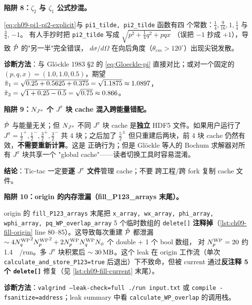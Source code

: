 \begin{pitfallbox}
\textbf{陷阱 8：\(\zeta_2\) 与 \(\zeta_1\) 公式抄混。}

\eqref{eq:ch09-pi1-pi2-explicit}与 \texttt{pi1\_tilde, pi2\_tilde} 函数有四
个常数：\(\tfrac{1}{4}, \tfrac{9}{16}, 1, \tfrac{1}{4}\) 与 \(\tfrac{3}{4}\), \(-1\)。
有人手抄时把 \texttt{pi2\_tilde} 写成 \(\sqrt{p^2+\tfrac{1}{4}q^2+pqx}\)
（误把 \(-1\) 抄成 \(+1\)），导致 \(\hat{\mathcal{P}}\) 的"另一半"完全错误，
\(d\sigma/d\Omega\) 在向后角度（\(\theta_{cm}>120^\circ\)）出现尖锐发散。

\textbf{诊断方法}：与 Glöckle 1983 \cite{Gloeckle1983} \S2 的 \eqref{eq:Gloeckle-pi}
直接对比；或对一个固定的 \((p, q, x)=(1.0, 1.0, 0.5)\)，期望
\(\tilde{\pi}_{1}=\sqrt{0.25+0.5625+0.375}=\sqrt{1.1875}\approx 1.0897\)，
\(\tilde{\pi}_{2}=\sqrt{1+0.25-0.5}=\sqrt{0.75}\approx 0.866\)。
\end{pitfallbox}

\begin{pitfallbox}
\textbf{陷阱 9：\(N_{J^\pi}\) 个 \(J^\pi\) 块 cache 混入跨能量错配。}

\(\hat{\mathcal{P}}\) 与能量无关；但 \(N_{J^\pi}\) 不同 \(J^\pi\) 块 cache 是\textbf{独立}
HDF5 文件。如果用户运行了 \(J^\pi=\tfrac{1}{2}^+, \tfrac{1}{2}^-,
\tfrac{3}{2}^+, \tfrac{3}{2}^-\) 共 4 块；之后加了 \(\tfrac{5}{2}^\pm\)
但只重建后两块，前 4 块 cache 仍然有效，\textbf{不需要重新计算}。这是
正确行为；但是 Glöckle 等人的 Bochum 求解器对所有 \(J^\pi\) 块共享一个
"global cache"——读者切换工具时容易混淆。

\textbf{结论}：Tic-tac 一定要\textbf{逐 \(J^\pi\) 文件}管理 cache；不要
跨工程/跨 fork 复制 cache 文件。
\end{pitfallbox}

\begin{pitfallbox}
\textbf{陷阱 10：origin 的内存泄漏（fill\_P123\_arrays 末尾）。}

origin 的 \texttt{fill\_P123\_arrays} 末尾把 \texttt{x\_array, wx\_array,
phi\_array, wphi\_array, pq\_WP\_overlap\_array} 5 个临时数组的
\texttt{delete[]} \textbf{注释掉}（\cref{lst:ch09-fill-origin}
line 80--85）。这导致每次重建 \(\hat{\mathcal{P}}\) 都泄漏
\(\sim 4{N_{q}^{\text{WP}}}^2{N_{p}^{\text{WP}}}^2 + 2{N_{p}^{\text{WP}}}{N_{q}^{\text{WP}}}N_{\phi}\) 个 double + 1 个 bool 数组，
对 \({N_{p}^{\text{WP}}}=20\) 约 \SI{1.4}{\mega\byte}/run。多 \(J^\pi\) 块积累后
\(\sim \SI{30}{\mega\byte}\)。这个 leak 在 origin 工作流（单次
\texttt{calculate\_and\_store\_P123=true} 后退出）下不致命，但被
current 通过\textbf{反注释 5 个 \texttt{delete[]}} 修复（见
\cref{lst:ch09-fill-current} 末尾）。

\textbf{诊断方法}：\texttt{valgrind --leak-check=full ./run input.txt}
或 \texttt{compile -fsanitize=address}；leak summary 中看
\texttt{calculate\_WP\_overlap} 的调用栈。
\end{pitfallbox}

